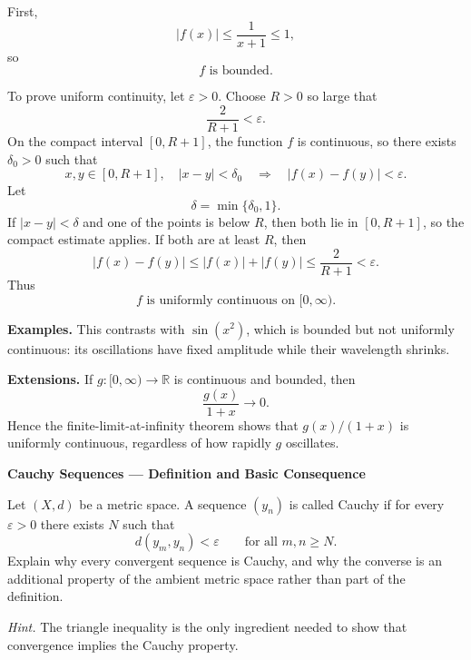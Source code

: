 \begin{solution}
First,
\[
|f(x)|
\le
\frac1{x+1}
\le1,
\]
so
\[
\boxed{f\text{ is bounded}.}
\]

To prove uniform continuity, let \(\varepsilon>0\). Choose \(R>0\) so large
that
\[
\frac{2}{R+1}<\varepsilon.
\]
On the compact interval \([0,R+1]\), the function \(f\) is continuous, so
there exists \(\delta_0>0\) such that
\[
x,y\in[0,R+1],\quad |x-y|<\delta_0
\quad\Longrightarrow\quad
|f(x)-f(y)|<\varepsilon.
\]
Let
\[
\delta=\min\{\delta_0,1\}.
\]
If \(|x-y|<\delta\) and one of the points is below \(R\), then both lie in
\([0,R+1]\), so the compact estimate applies. If both are at least \(R\),
then
\[
|f(x)-f(y)|
\le
|f(x)|+|f(y)|
\le
\frac2{R+1}
<\varepsilon.
\]
Thus
\[
\boxed{f\text{ is uniformly continuous on }[0,\infty).}
\]

\medskip
\noindent\textbf{Examples.}
This contrasts with \(\sin(x^2)\), which is bounded but not uniformly
continuous: its oscillations have fixed amplitude while their wavelength
shrinks.

\medskip
\noindent\textbf{Extensions.}
If \(g:[0,\infty)\to\mathbb R\) is continuous and bounded, then
\[
\frac{g(x)}{1+x}\to0.
\]
Hence the finite-limit-at-infinity theorem shows that
\(g(x)/(1+x)\) is uniformly continuous, regardless of how rapidly \(g\)
oscillates.
\end{solution}


\begin{problem}[CP-II-0545]
\label{prob:cp-ii-0545}
\textbf{Cauchy Sequences --- Definition and Basic Consequence}

\hspace*{1.5em}Let \((X,d)\) be a metric space. A sequence \((y_n)\) is called Cauchy if
for every \(\varepsilon>0\) there exists \(N\) such that
\[
d(y_m,y_n)<\varepsilon
\qquad\text{for all }m,n\ge N.
\]
Explain why every convergent sequence is Cauchy, and why the converse is an
additional property of the ambient metric space rather than part of the
definition.

\medskip
\noindent\emph{Hint.} The triangle inequality is the only ingredient needed to show that convergence
implies the Cauchy property.
\end{problem}

